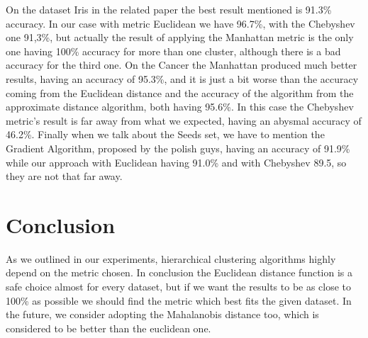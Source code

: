 \documentclass[conference]{IEEEtran}
\begin{document}
On the dataset Iris in the related paper the best result mentioned is 91.3\% accuracy. In our case with metric Euclidean we have 96.7\%, with the Chebyshev one 91,3\%, but actually the result of applying the Manhattan metric is the only one having 100\% accuracy for more than one cluster, although there is a bad accuracy for the third one.
On the Cancer the Manhattan produced much better results, having an accuracy of 95.3\%, and it is just a bit worse than the accuracy coming from the Euclidean distance and the accuracy of the algorithm from the approximate distance algorithm, both having 95.6\%. In this case the Chebyshev metric's result is far away from what we expected, having an abysmal accuracy of 46.2\%.
Finally when we talk about the Seeds set, we have to mention the Gradient Algorithm, proposed by the polish guys, having an accuracy of 91.9\% while our approach with Euclidean having 91.0\% and with Chebyshev 89.5, so they are not that far away.

\section{Conclusion}
\label{Conclusion}

As we outlined in our experiments, hierarchical clustering algorithms highly depend on the metric chosen. In conclusion the Euclidean distance function is a safe choice almost for every dataset, but if we want the results to be as close to 100\% as possible we should find the metric which best fits the given dataset. In the future, we consider adopting the Mahalanobis \cite{website:mahalanobis} distance too, which is considered to be better than the euclidean one.



\end{document}
